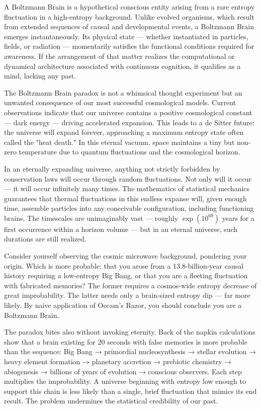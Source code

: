 A Boltzmann Brain is a hypothetical conscious entity arising from a rare entropy fluctuation in a high-entropy background. Unlike evolved organisms, which result from extended sequences of causal and developmental events, a Boltzmann Brain emerges instantaneously. Its physical state — whether instantiated in particles, fields, or radiation — momentarily satisfies the functional conditions required for awareness. If the arrangement of that matter realizes the computational or dynamical architecture associated with continuous cognition, it qualifies as a mind, lacking any past.

The Boltzmann Brain paradox is not a whimsical thought experiment but an unwanted consequence of our most successful cosmological models. Current observations indicate that our universe contains a positive cosmological constant — dark energy — driving accelerated expansion. This leads to a de Sitter future: the universe will expand forever, approaching a maximum entropy state often called the "heat death." In this eternal vacuum, space maintains a tiny but non-zero temperature due to quantum fluctuations and the cosmological horizon.

In an eternally expanding universe, anything not strictly forbidden by conservation laws will occur through random fluctuations. Not only will it occur — it will occur infinitely many times. The mathematics of statistical mechanics guarantees that thermal fluctuations in this endless expanse will, given enough time, assemble particles into any conceivable configuration, including functioning brains. The timescales are unimaginably vast — roughly $\exp(10^{69})$ years for a first occurrence within a horizon volume — but in an eternal universe, such durations are still realized.

Consider yourself observing the cosmic microwave background, pondering your origin. Which is more probable: that you arose from a 13.8-billion-year causal history requiring a low-entropy Big Bang, or that you are a fleeting fluctuation with fabricated memories? The former requires a cosmos-wide entropy decrease of great improbability. The latter needs only a brain-sized entropy dip — far more likely. By naive application of Occam's Razor, you should conclude you are a Boltzmann Brain.

The paradox bites also without invoking eternity. Back of the napkin calculations show that a brain existing for 20 seconds with false memories is more probable than the sequence: Big Bang → primordial nucleosynthesis → stellar evolution → heavy element formation → planetary accretion → prebiotic chemistry → abiogenesis → billions of years of evolution → conscious observers. Each step multiplies the improbability. A universe beginning with entropy low enough to support this chain is less likely than a single, brief fluctuation that mimics its end result. The problem undermines the statistical credibility of our past.

